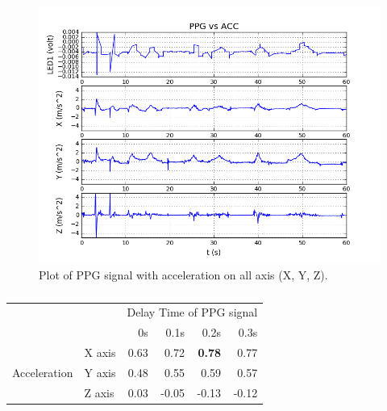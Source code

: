 \documentclass[11pt, draftclsnofoot, onecolumn]{IEEEtran}
\begin{document}
    \begin{figure}[h]	
        \centering
        \includegraphics[scale=0.50]{xyz_acc_ppg_acc_8} 
        \caption{Plot of PPG signal with acceleration on all axis (X, Y, Z).}
        \label{fig:XYZ_AccPPG}
    \end{figure}
    
    \begin{table}[ht]
	\centering
        \caption{}
		\label{table:XYZ_AccPPG}
		\begin{tabular}{ l l|r|r|r|r| }
			\cline{3-6}
            & & \multicolumn{4}{|c|}{Delay Time of PPG signal} \\
            \cline{3-6}
            	& & 0s & 0.1s & 0.2s & 0.3s  \\
			\hline
            \multicolumn{1}{|c|}{\multirow{3}{*}{Acceleration}} 
            	& X axis & 0.63  & 0.72  & \textbf{0.78}  &  0.77  \\
            \cline{2-6}
            \multicolumn{1}{|c|}{} 
            	& Y axis & 0.48  & 0.55  & 0.59 &  0.57  \\
            \cline{2-6}
            \multicolumn{1}{|c|}{} 
            	& Z axis & 0.03  & -0.05 & -0.13 & -0.12  \\
			\hline
		\end{tabular}
	\end{table}
    
\end{document}
